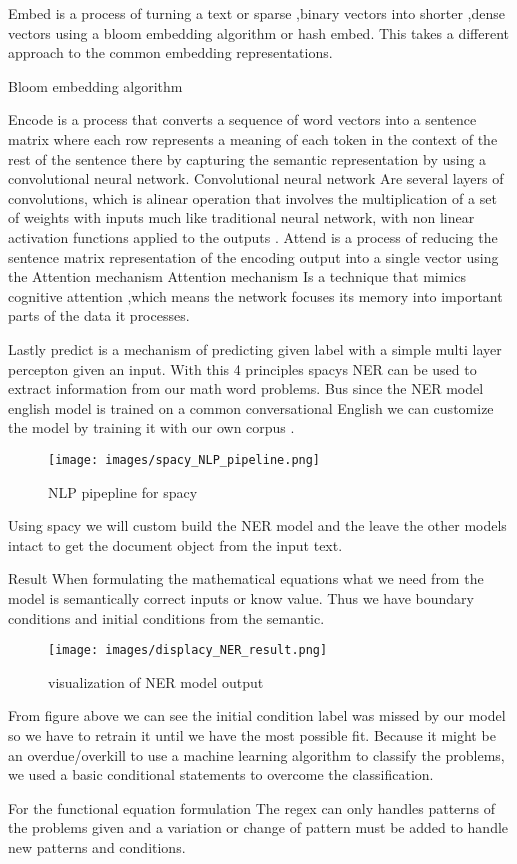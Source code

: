     Embed is a process of turning a text or sparse ,binary vectors into shorter ,dense vectors using a bloom embedding algorithm or hash embed. This takes a different approach to the common embedding representations. 
    
 Bloom embedding algorithm 




Encode is a process that converts a sequence of word vectors into a sentence matrix where each row represents a meaning of each token in the context of the rest of the sentence there by capturing the semantic representation by using a convolutional neural network. 
Convolutional neural network 
Are several layers of convolutions, which is alinear operation that involves the multiplication of a set of weights with inputs much like traditional neural network, with non linear activation functions applied to the outputs .
Attend is a process of reducing the sentence matrix representation of the encoding output into a single vector using the Attention mechanism
Attention mechanism   
Is a technique that mimics cognitive attention ,which means the network focuses its memory into important parts of the data it processes. 

Lastly predict is a mechanism of predicting given label with a simple multi layer percepton given an input.
With this 4 principles spacys NER can be used to extract information from our math word problems. 
Bus since the NER model english model is trained on a common conversational English we can customize the model by training it with our own corpus . 
\begin{figure}[hbt!]
    \centering
    \texttt{[image: images/spacy\_NLP\_pipeline.png]}
    \caption{NLP pipepline for spacy}
    \label{fig:NLP pipelinel}
\end{figure} 
 
Using spacy we will custom build the NER model and the leave the other models intact to get the document object from the input text. 

Result
When formulating the mathematical equations what we need from the model is semantically correct inputs or know value. Thus we have boundary conditions and initial conditions from the semantic.

\begin{figure}[hbt!]
    \centering
    \texttt{[image: images/displacy\_NER\_result.png]}
    \caption{visualization of NER model output}
    \label{fig:NLP Visulaizationl}
\end{figure} 
From figure above we can see the initial condition label was missed by our model so we have to retrain it until we have the most possible fit. 
Because it might be an overdue/overkill  to use a machine learning algorithm to classify the problems, we used a basic conditional statements to overcome the classification.

For the functional equation formulation The regex can only handles patterns of the problems given and a variation or change of pattern must be added to handle new patterns and conditions. 